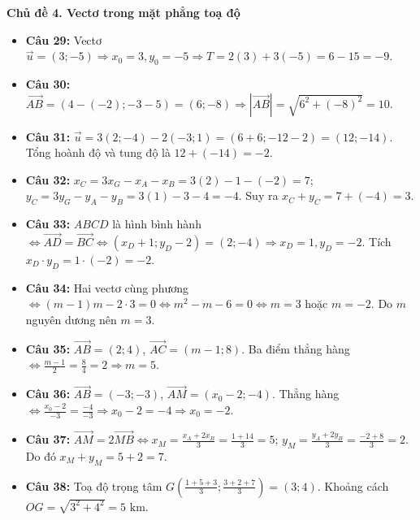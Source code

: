 \documentclass[12pt,a4paper]{article}
\begin{document}
\noindent\textbf{\large Chủ đề 4. Vectơ trong mặt phẳng toạ độ}
\begin{itemize}[leftmargin=1.5em, itemsep=1.8pt]
    \item \textbf{Câu 29:} Vectơ $\vec{u} = (3; -5) \Rightarrow x_0 = 3, y_0 = -5 \Rightarrow T = 2(3) + 3(-5) = 6 - 15 = -9$.
    \item \textbf{Câu 30:} $\vec{AB} = (4 - (-2); -3 - 5) = (6; -8) \Rightarrow |\vec{AB}| = \sqrt{6^2 + (-8)^2} = 10$.
    \item \textbf{Câu 31:} $\vec{u} = 3(2; -4) - 2(-3; 1) = (6 + 6; -12 - 2) = (12; -14)$. Tổng hoành độ và tung độ là $12 + (-14) = -2$.
    \item \textbf{Câu 32:} $x_C = 3x_G - x_A - x_B = 3(2) - 1 - (-2) = 7$; $y_C = 3y_G - y_A - y_B = 3(1) - 3 - 4 = -4$. Suy ra $x_C + y_C = 7 + (-4) = 3$.
    \item \textbf{Câu 33:} $ABCD$ là hình bình hành $\Leftrightarrow \vec{AD} = \vec{BC} \Leftrightarrow (x_D + 1; y_D - 2) = (2; -4) \Rightarrow x_D = 1, y_D = -2$. Tích $x_D \cdot y_D = 1 \cdot (-2) = -2$.
    \item \textbf{Câu 34:} Hai vectơ cùng phương $\Leftrightarrow (m - 1)m - 2 \cdot 3 = 0 \Leftrightarrow m^2 - m - 6 = 0 \Leftrightarrow m = 3$ hoặc $m = -2$. Do $m$ nguyên dương nên $m = 3$.
    \item \textbf{Câu 35:} $\vec{AB} = (2; 4)$, $\vec{AC} = (m - 1; 8)$. Ba điểm thẳng hàng $\Leftrightarrow \frac{m - 1}{2} = \frac{8}{4} = 2 \Rightarrow m = 5$.
    \item \textbf{Câu 36:} $\vec{AB} = (-3; -3)$, $\vec{AM} = (x_0 - 2; -4)$. Thẳng hàng $\Leftrightarrow \frac{x_0 - 2}{-3} = \frac{-4}{-3} \Rightarrow x_0 - 2 = -4 \Rightarrow x_0 = -2$.
    \item \textbf{Câu 37:} $\vec{AM} = 2\vec{MB} \Leftrightarrow x_M = \frac{x_A + 2x_B}{3} = \frac{1 + 14}{3} = 5$; $y_M = \frac{y_A + 2y_B}{3} = \frac{-2 + 8}{3} = 2$. Do đó $x_M + y_M = 5 + 2 = 7$.
    \item \textbf{Câu 38:} Toạ độ trọng tâm $G\left(\frac{1+5+3}{3}; \frac{3+2+7}{3}\right) = (3; 4)$. Khoảng cách $OG = \sqrt{3^2 + 4^2} = 5\text{ km}$.
\end{itemize}
\end{document}
